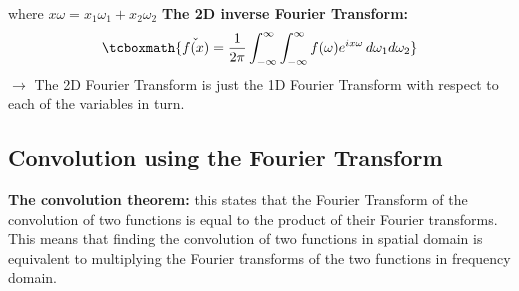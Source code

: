 \documentclass{article}
\begin{document}
	where $ x\omega = x_1\omega_{1} + x_2 \omega_{2}$
\newline 
\vspace{0.1cm}
\newline
\textbf{The 2D inverse Fourier Transform: }
\begin{equation}
		\tcboxmath {\check{f(x)} = \frac{1}{2\pi}\int_{-\infty}^{\infty} \int_{-\infty}^{\infty}f(\omega)e^{ix\omega} \, d\omega_{1} d\omega_{2}}
\end{equation}
	$\rightarrow$ The 2D Fourier Transform is just the 1D Fourier Transform with respect to each of the variables in turn.

\subsection{Convolution using the Fourier Transform}

\textbf{The convolution theorem: }this states that the Fourier Transform of the convolution of two functions is equal to the product of their Fourier transforms.
\newline
This means that finding the convolution of two functions in spatial domain is equivalent to multiplying the Fourier transforms of the two functions in frequency domain.
\end{document}
